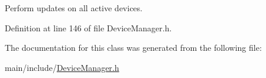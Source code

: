 Perform updates on all active devices. 

Definition at line 146 of file Device\+Manager.\+h.


\begin{DoxyCode}{0}

\end{DoxyCode}


The documentation for this class was generated from the following file\+:\begin{DoxyCompactItemize}
\item 
main/include/\mbox{\hyperlink{DeviceManager_8h}{Device\+Manager.\+h}}\end{DoxyCompactItemize}
